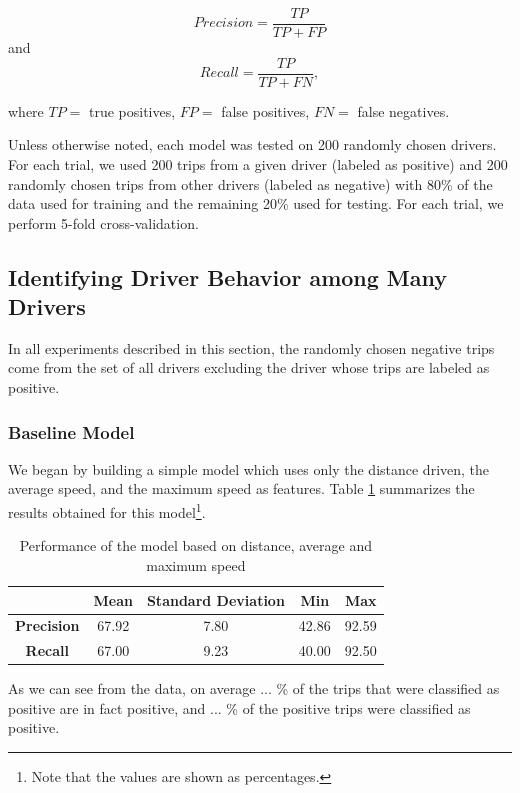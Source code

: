 \documentclass{article}
\begin{document}
\begin{equation*}
Precision = \frac{TP}{TP+FP}
\end{equation*}
and 
\begin{equation*}
Recall = \frac{TP}{TP+FN}, 
\end{equation*}

where $TP = $ true positives, $FP = $ false positives, $FN = $ false negatives.

Unless otherwise noted, each model was tested on 200 randomly chosen drivers. For each trial, we used 200 trips from a given driver (labeled as positive) and 200 randomly chosen trips from other drivers (labeled as negative) with 80\% of the data used for training and the remaining 20\% used for testing. For each trial, we perform 5-fold cross-validation. 


\subsection{Identifying Driver Behavior among Many Drivers} %

In all experiments described in this section, the randomly chosen negative trips come from the set of all drivers excluding the driver whose trips are labeled as positive. 
\subsubsection{Baseline Model}

We began by building a simple model which uses only the distance driven, the average speed, and the maximum speed as features. Table \ref{tab:mod1} summarizes the results obtained for this model\footnote{Note that the values are shown as percentages.}.


\begin{table}[h]
\centering
\begin{tabular}{|c|c|c|c|c|} \hline
& {\bf Mean} & {\bf Standard Deviation} & {\bf Min} & {\bf Max} \\ \hline
{\bf Precision} & 67.92 & 7.80 & 42.86 & 92.59 \\ \hline 
{\bf Recall} & 67.00 & 9.23 & 40.00 & 92.50\\ \hline
\end{tabular}
\caption{Performance of the model based on distance, average and maximum speed}
\label{tab:mod1}
\end{table}


As we can see from the data, on average ... \% of the trips that were classified as positive are in fact positive, and ... \% of the positive trips were classified as positive. 
\end{document}
